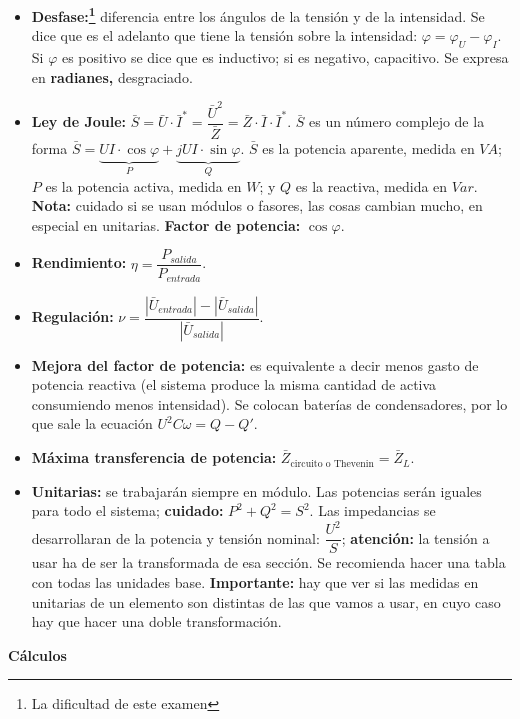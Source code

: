 \documentclass[a4paper, twocolumn, 10pt]{article}
\begin{document}
\begin{itemize}
	\item \textbf{Desfase:\footnote{La dificultad de este examen}} diferencia entre los ángulos de la tensión y de la intensidad. Se dice que es el adelanto que tiene la tensión sobre la intensidad: $\varphi = \varphi_U - \varphi_I$. Si $\varphi$ es positivo se dice que es inductivo; si es negativo, capacitivo. Se expresa en \textbf{radianes,} desgraciado.
	\item \textbf{Ley de Joule:} $\bar{S} = \bar{U} \cdot \bar{I}^* = \dfrac{\bar{U}^2}{\bar{Z}} = \bar{Z} \cdot \bar{I} \cdot \bar{I}^*$. $\bar{S}$ es un número complejo de la forma $\bar{S} = \underbrace{UI \cdot \cos\varphi}_P + \underbrace{jUI\cdot\sin\varphi}_Q$. $\bar{S}$ es la potencia aparente, medida en $VA$; $P$ es la potencia activa, medida en $W$; y $Q$ es la reactiva, medida en $Var$. \textbf{Nota:} cuidado si se usan módulos o fasores, las cosas cambian mucho, en especial en unitarias. \textbf{Factor de potencia:} $\cos\varphi$.
	\item \textbf{Rendimiento:} $\eta = \dfrac{P_{salida}}{P_{entrada}}$.
	\item \textbf{Regulación:} $\nu = \dfrac{|\bar{U}_{entrada}| - |\bar{U}_{salida}|}{|\bar{U}_{salida}|}$.
	\item \textbf{Mejora del factor de potencia:} es equivalente a decir menos gasto de potencia reactiva (el sistema produce la misma cantidad de activa consumiendo menos intensidad). Se colocan baterías de condensadores, por lo que sale la ecuación $U^2C\omega = Q - Q'$.
	\item \textbf{Máxima transferencia de potencia:} $\bar{Z}_{\text{circuito o Thevenin}} = \bar{Z}_L$.
	\item \textbf{Unitarias:} se trabajarán siempre en módulo. Las potencias serán iguales para todo el sistema; \textbf{cuidado:} $P^2 + Q^2  = S^2$. Las impedancias se desarrollaran de la potencia y tensión nominal: $\dfrac{U^2}{S}$; \textbf{atención:} la tensión a usar ha de ser la transformada de esa sección. Se recomienda hacer una tabla con todas las unidades base. \textbf{Importante:} hay que ver si las medidas en unitarias de un elemento son distintas de las que vamos a usar, en cuyo caso hay que hacer una doble transformación.
\end{itemize}

\Large\textbf{Cálculos} \normalsize
\end{document}
